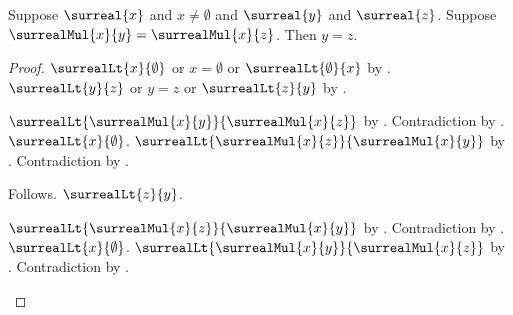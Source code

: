 \begin{theorem}\label{surreal_mul_nonzero_cancel_left}
    Suppose $\surreal{x}$ and $x\neq\emptyset$ and
        $\surreal{y}$ and $\surreal{z}$.
    Suppose $\surrealMul{x}{y}=\surrealMul{x}{z}$.
    Then $y=z$.
\end{theorem}
\begin{proof}
    $\surrealLt{x}{\emptyset}$ or $x=\emptyset$ or
        $\surrealLt{\emptyset}{x}$
        by .
    $\surrealLt{y}{z}$ or $y=z$ or $\surrealLt{z}{y}$
        by .
    \begin{byCase}
            \begin{byCase}
                    $\surrealLt{\surrealMul{x}{y}}{\surrealMul{x}{z}}$
                        by .
                    Contradiction by
                        .
                    $\surrealLt{x}{\emptyset}$.
                    $\surrealLt{\surrealMul{x}{z}}{\surrealMul{x}{y}}$
                        by .
                    Contradiction by
                        .
            \end{byCase}
            \begin{byCase}
                    Follows.
                    $\surrealLt{z}{y}$.
                    \begin{byCase}
                            $\surrealLt{\surrealMul{x}{z}}
                                {\surrealMul{x}{y}}$
                                by .
                            Contradiction by
                                .
                            $\surrealLt{x}{\emptyset}$.
                            $\surrealLt{\surrealMul{x}{y}}
                                {\surrealMul{x}{z}}$
                                by .
                            Contradiction by
                                .
                    \end{byCase}
            \end{byCase}
    \end{byCase}
\end{proof}

